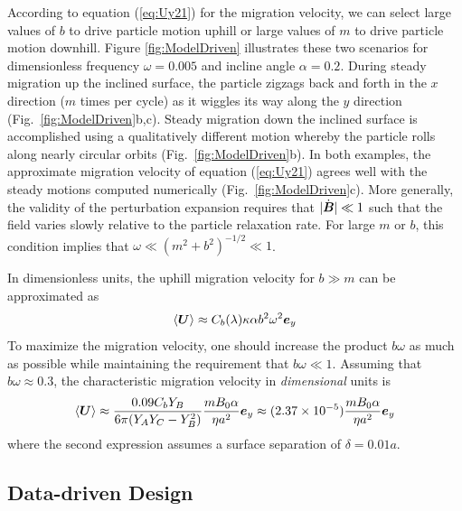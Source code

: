 According to equation (\ref{eq:Uy21}) for the migration velocity, we can select large values of $b$ to drive particle motion uphill or large values of $m$ to drive particle motion downhill.  Figure \ref{fig:ModelDriven} illustrates these two scenarios for dimensionless frequency $\omega=0.005$ and incline angle $\alpha=0.2$.  During steady migration up the inclined surface, the particle zigzags back and forth in the $x$ direction ($m$ times per cycle) as it wiggles its way along the $y$ direction (Fig.~\ref{fig:ModelDriven}b,c). Steady migration down the inclined surface is accomplished using a qualitatively different motion whereby the particle rolls along nearly circular orbits (Fig.~\ref{fig:ModelDriven}b). In both examples, the approximate migration velocity of equation (\ref{eq:Uy21}) agrees well with the steady motions computed numerically (Fig.~\ref{fig:ModelDriven}c).  More generally, the validity of the perturbation expansion requires that $|\dot{\boldsymbol{B}}| \ll 1$ such that the field varies slowly relative to the particle relaxation rate. For large $m$ or $b$, this condition implies that $\omega\ll (m^2+b^2)^{-1/2} \ll 1$.

In dimensionless units, the uphill migration velocity for $b\gg m$ can be approximated as 
\begin{equation}
    \langle \boldsymbol{U} \rangle \approx C_b(\lambda) \kappa \alpha b^2\omega^2 \boldsymbol{e}_y 
\end{equation}
To maximize the migration velocity, one should increase the product $b\omega$ as much as possible while maintaining the requirement that $b\omega \ll 1$.  Assuming that $b\omega\approx 0.3$, the characteristic migration velocity in \emph{dimensional} units is
\begin{equation}
    \langle \boldsymbol{U} \rangle \approx \frac{0.09 C_b Y_B}{6\pi (Y_A Y_C-Y_B^2)} \frac{m B_0\alpha}{\eta a^2} \boldsymbol{e}_y \approx (2.37\times10^{-5}) \frac{m B_0 \alpha}{\eta a^2}  \boldsymbol{e}_y
\end{equation}
where the second expression assumes a surface separation of $\delta=0.01a$. 





\subsection{Data-driven Design}

